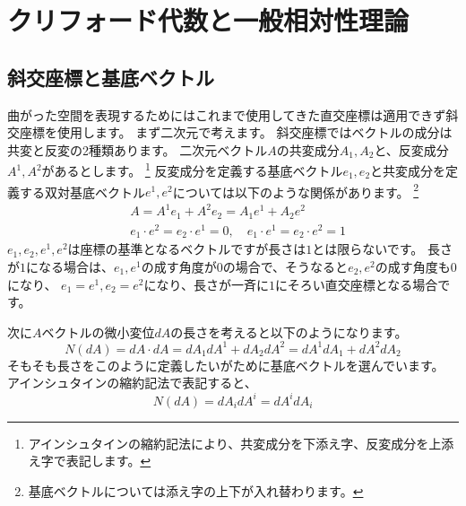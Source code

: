 \documentclass[a4paper,12pt,notitlepage]{jsreport}
\begin{document}
\chapter{クリフォード代数と一般相対性理論}

\section{斜交座標と基底ベクトル}

曲がった空間を表現するためにはこれまで使用してきた直交座標は適用できず斜交座標を使用します。
まず二次元で考えます。
斜交座標ではベクトルの成分は共変と反変の2種類あります。
二次元ベクトル$A$の共変成分$A_1,A_2$と、反変成分$A^1,A^2$があるとします。
\footnote{アインシュタインの縮約記法により、共変成分を下添え字、反変成分を上添え字で表記します。}
反変成分を定義する基底ベクトル$e_1,e_2$と共変成分を定義する双対基底ベクトル$e^1,e^2$については以下のような関係があります。
\footnote{基底ベクトルについては添え字の上下が入れ替わります。}
\begin{equation}
  \begin{split}
    &A=A^1e_1+A^2e_2=A_1e^1+A_2e^2\\
    &e_1\cdot e^2=e_2\cdot e^1=0,\quad e_1\cdot e^1=e_2\cdot e^2=1
  \end{split}
\end{equation}
$e_1,e_2,e^1,e^2$は座標の基準となるベクトルですが長さは$1$とは限らないです。
長さが$1$になる場合は、$e_1,e^1$の成す角度が$0$の場合で、そうなると$e_2,e^2$の成す角度も$0$になり、
$e_1=e^1,e_2=e^2$になり、長さが一斉に$1$にそろい直交座標となる場合です。

次に$A$ベクトルの微小変位$dA$の長さを考えると以下のようになります。
\begin{equation}
  N(dA)=dA\cdot dA=dA_1dA^1+dA_2dA^2=dA^1dA_1+dA^2dA_2
\end{equation}
そもそも長さをこのように定義したいがために基底ベクトルを選んでいます。
アインシュタインの縮約記法で表記すると、
\begin{equation}
  N(dA)=dA_idA^i=dA^idA_i
\end{equation}
\end{document}
